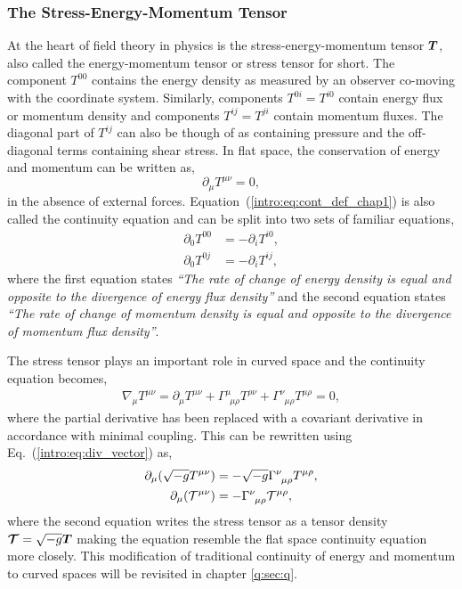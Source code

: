 \subsubsection{The Stress-Energy-Momentum Tensor}
At the heart of field theory in physics is the stress-energy-momentum tensor $\boldsymbol{T}$, also called the energy-momentum tensor or stress tensor for short. The component $T^{00}$ contains the energy density as measured by an observer co-moving with the coordinate system.
Similarly, components $T^{0i}=T^{i0}$ contain energy flux or momentum density and components $T^{ij}=T^{ji}$ contain momentum fluxes. The diagonal part of $T^{ij}$ can also be though of as containing pressure and the off-diagonal terms containing shear stress. In flat space, the conservation of energy and momentum can be written as,
\begin{equation}
\partial_\mu T^{\mu\nu} =0,\label{intro:eq:cont_def_chap1}
\end{equation}
in the absence of external forces. Equation~(\ref{intro:eq:cont_def_chap1}) is also called the continuity equation and can be split into two sets of familiar equations,
\begin{align}
\partial_0 T^{00} &= - \partial_i T^{i0}, \\
\partial_0 T^{0j} &= - \partial_i T^{ij},
\end{align}
where the first equation states {\it \enquote{The rate of change of energy density is equal and opposite to the divergence of energy flux density}} and the second equation states {\it \enquote{The rate of change of momentum density is equal and opposite to the divergence of momentum flux density}}.

The stress tensor plays an important role in curved space and the continuity equation becomes,
\begin{align}
\nabla_\mu T^{\mu\nu} = \partial_\mu T^{\mu\nu}  + \Gamma^\mu_{\,\,\,\mu \rho}T^{\rho \nu}  + \Gamma^\nu_{\,\,\,\mu\rho}T^{\mu\rho}= 0\label{intro:eq:cont},
\end{align}
where the partial derivative has been replaced with a covariant derivative in accordance with minimal coupling. This can be rewritten using Eq.~(\ref{intro:eq:div_vector}) as,
\begin{align}
\partial_\mu( \sqrt{-g} T^{\mu\nu})  &=-\sqrt{-g} \Gamma^\nu_{\,\,\,\mu\rho}T^{\mu\rho},\\
\partial_\mu( \mathcal{T}^{\mu\nu})  &=-\Gamma^\nu_{\,\,\,\mu\rho}\mathcal{T}^{\mu\rho},
\end{align}
where the second equation writes the stress tensor as a tensor density $\boldsymbol{\mathcal{T}} = \sqrt{-g} \boldsymbol{T}$ making the equation resemble the flat space continuity equation more closely. This modification of traditional continuity of energy and momentum to curved spaces will be revisited in chapter \ref{q:sec:q}.


